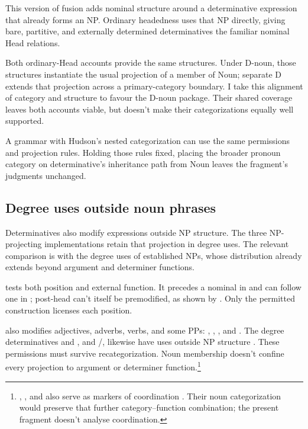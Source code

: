 \documentclass[12pt]{article}
\begin{document}
This version of fusion adds nominal structure around a determinative expression that already forms an NP. Ordinary headedness uses that NP directly, giving bare, partitive, and externally determined determinatives the familiar nominal Head relations.

Both ordinary-Head accounts provide the same structures. Under D-noun, those structures instantiate the usual projection of a member of Noun; separate D extends that projection across a primary-category boundary. I take this alignment of category and structure to favour the D-noun package. Their shared coverage leaves both accounts viable, but doesn't make their categorizations equally well supported.

A grammar with Hudson's nested categorization can use the same permissions and projection rules. Holding those rules fixed, placing the broader pronoun category on determinative's inheritance path from Noun leaves the fragment's judgments unchanged.

\subsection{Degree uses outside noun phrases}\label{sec:enough}

Determinatives also modify expressions outside NP structure. The three NP-projecting implementations retain that projection in degree uses. The relevant comparison is with the degree uses of established NPs, whose distribution already extends beyond argument and determiner functions.

 tests both position and external function. It precedes a nominal in  and can follow one in ; post-head  can't itself be premodified, as shown by  \citep[396--397, 445]{huddleston2002}. Only the permitted construction licenses each position.

 also modifies adjectives, adverbs, verbs, and some PPs: , , , and  \citep[396--397]{huddleston2002}. The degree determinatives  and , and /, likewise have uses outside NP structure \citep[390, 395--397]{huddleston2002}. These permissions must survive recategorization. Noun membership doesn't confine every projection to argument or determiner function.\footnote{, , and  also serve as markers of coordination \citep[1305, 1308]{huddleston2002}. Their noun categorization would preserve that further category--function combination; the present fragment doesn't analyse coordination.}
\end{document}
